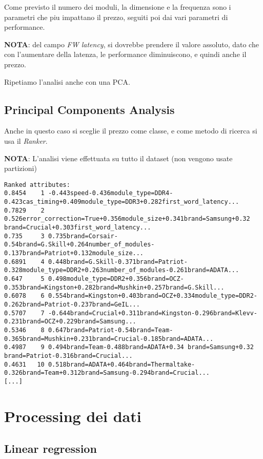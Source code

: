 \documentclass[12pt]{report}
\begin{document}
Come previsto il numero dei moduli, la dimensione e la frequenza sono i parametri che piu impattano
il prezzo, seguiti poi dai vari parametri di performance.

\textbf{NOTA}: del campo \textit{FW latency}, si dovrebbe prendere il valore assoluto, dato che con
l'aumentare della latenza, le performance diminuiscono, e quindi anche il prezzo.

Ripetiamo l'analisi anche con una PCA.

\newpage
\subsection{Principal Components Analysis}
Anche in questo caso si sceglie il prezzo come classe, e come metodo di ricerca si usa il \textit{Ranker}.

\textbf{NOTA}: L'analisi viene effettuata su tutto il dataset (non vengono usate partizioni)

\begin{lstlisting}
Ranked attributes:
0.8454    1 -0.443speed-0.436module_type=DDR4-0.423cas_timing+0.409module_type=DDR3+0.282first_word_latency...
0.7829    2 0.526error_correction=True+0.356module_size+0.341brand=Samsung+0.32 brand=Crucial+0.303first_word_latency...
0.735     3 0.735brand=Corsair-0.54brand=G.Skill+0.264number_of_modules-0.137brand=Patriot+0.132module_size...
0.6891    4 0.448brand=G.Skill-0.371brand=Patriot-0.328module_type=DDR2+0.263number_of_modules-0.261brand=ADATA...
0.647     5 0.498module_type=DDR2+0.356brand=OCZ-0.353brand=Kingston+0.282brand=Mushkin+0.257brand=G.Skill...
0.6078    6 0.554brand=Kingston+0.403brand=OCZ+0.334module_type=DDR2-0.262brand=Patriot-0.237brand=GeIL...
0.5707    7 -0.644brand=Crucial+0.311brand=Kingston-0.296brand=Klevv-0.231brand=OCZ+0.229brand=Samsung...
0.5346    8 0.647brand=Patriot-0.54brand=Team-0.365brand=Mushkin+0.231brand=Crucial-0.185brand=ADATA...
0.4987    9 0.494brand=Team-0.488brand=ADATA+0.34 brand=Samsung+0.32 brand=Patriot-0.316brand=Crucial...
0.4631   10 0.518brand=ADATA+0.464brand=Thermaltake-0.326brand=Team+0.312brand=Samsung-0.294brand=Crucial...
[...]
\end{lstlisting}

\section{Processing dei dati}
\subsection{Linear regression}
\end{document}
